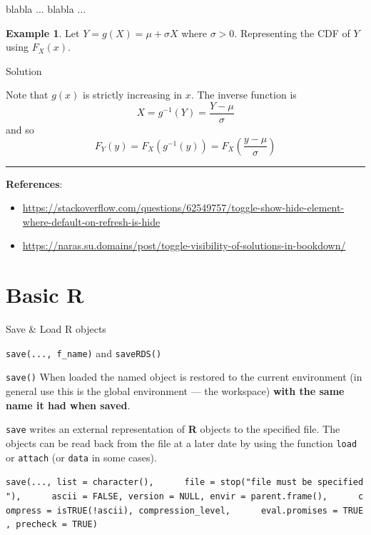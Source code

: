 \documentclass[
  a4paper,
  twoside,
  openright]{book}
\newenvironment{Shaded}{\begin{snugshade}}{\end{snugshade}}
\newcommand{\NormalTok}[1]{#1}
\providecommand{\tightlist}{%
  \setlength{\itemsep}{0pt}\setlength{\parskip}{0pt}}
\theoremstyle{definition}
\theoremstyle{definition}
\newtheorem{example}{Example}[chapter]
\theoremstyle{definition}
\theoremstyle{definition}
\theoremstyle{remark}
\begin{document}
\begin{Shaded}
\begin{Highlighting}[]
\NormalTok{blabla ...}
\NormalTok{blabla ...}
\end{Highlighting}
\end{Shaded}

\begin{example}
\protect\hypertarget{exm:ex1}{}\label{exm:ex1}Let \(Y=g(X)=\mu+\sigma X\) where \(\sigma>0\). Representing the CDF of \(Y\) using \(F_X(x)\).
\end{example}

Solution

\label{myDIV}
Note that \(g(x)\) is strictly increasing in \(x\).
The inverse function is
\[
X = g^{-1}(Y) = \frac{Y-\mu}{\sigma}
\]
and so
\[
F_Y(y) = F_X\left(g^{-1}(y)\right) = F_X\left(\frac{y-\mu}{\sigma}\right)
\]

\begin{center}\rule{0.5\linewidth}{0.5pt}\end{center}

\textbf{References}:

\begin{itemize}
\tightlist
\item
  \url{https://stackoverflow.com/questions/62549757/toggle-show-hide-element-where-default-on-refresh-is-hide}
\item
  \url{https://naras.su.domains/post/toggle-visibility-of-solutions-in-bookdown/}
\end{itemize}

\chapter{Basic R}\label{basic-r}

Save \& Load R objects

\texttt{save(...,\ f\_name)} and \texttt{saveRDS()}

\texttt{save()} When loaded the named object is restored to the current environment (in general use this is the global environment --- the workspace) \textbf{with the same name it had when saved}.

\texttt{save} writes an external representation of \textbf{R} objects to the specified file. The objects can be read back from the file at a later date by using the function \texttt{load} or \texttt{attach} (or \texttt{data} in some cases).

\texttt{save(...,\ list\ =\ character(),\ \ \ \ \ \ file\ =\ stop("\textquotesingle{}file\textquotesingle{}\ must\ be\ specified"),\ \ \ \ \ \ ascii\ =\ FALSE,\ version\ =\ NULL,\ envir\ =\ parent.frame(),\ \ \ \ \ \ compress\ =\ isTRUE(!ascii),\ compression\_level,\ \ \ \ \ \ eval.promises\ =\ TRUE,\ precheck\ =\ TRUE)}
\end{document}
